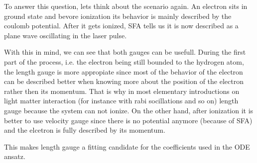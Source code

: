 To answer this question, lets think about the scenario again.
An electron sits in ground state and bevore ionization its behavior is mainly described by the coulomb potential.
After it gets ionized, SFA tells us it is now described as a plane wave oscillating in the laser pulse.

With this in mind, we can see that both gauges can be usefull.
During the first part of the process, i.e. the electron being still bounded to the hydrogen atom, the length gauge is more appropiate since most of the behavior of the electron can be described better when knowing more about the position of the electron rather then its momentum.
That is why in most elementary introductions on light matter interaction (for instance with rabi socillations and so on) length gauge because the system can not ionize.
On the other hand, after ionization it is better to use velocity gauge since there is no potential anymore (because of SFA) and the elcetron is fully described by its momentum.

This makes length gauge a fitting candidate for the coefficients used in the ODE ansatz.










